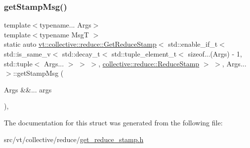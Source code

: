 \subsubsection{\texorpdfstring{get\+Stamp\+Msg()}{getStampMsg()}}
{\footnotesize\ttfamily template$<$typename... Args$>$ \\
template$<$typename MsgT $>$ \\
static auto \hyperlink{structvt_1_1collective_1_1reduce_1_1_get_reduce_stamp}{vt\+::collective\+::reduce\+::\+Get\+Reduce\+Stamp}$<$ std\+::enable\+\_\+if\+\_\+t$<$ std\+::is\+\_\+same\+\_\+v$<$ std\+::decay\+\_\+t$<$ std\+::tuple\+\_\+element\+\_\+t$<$ sizeof...(Args) -\/ 1, std\+::tuple$<$ Args... $>$ $>$ $>$, \hyperlink{namespacevt_1_1collective_1_1reduce_a7b7cb3021ac5654d92825d9fab0250b2}{collective\+::reduce\+::\+Reduce\+Stamp} $>$ $>$, Args... $>$\+::get\+Stamp\+Msg (\begin{DoxyParamCaption}\item[{Args \&\&...}]{args }\end{DoxyParamCaption})\hspace{0.3cm}{\ttfamily [inline]}, {\ttfamily [static]}}



The documentation for this struct was generated from the following file\+:\begin{DoxyCompactItemize}
\item 
src/vt/collective/reduce/\hyperlink{get__reduce__stamp_8h}{get\+\_\+reduce\+\_\+stamp.\+h}\end{DoxyCompactItemize}

